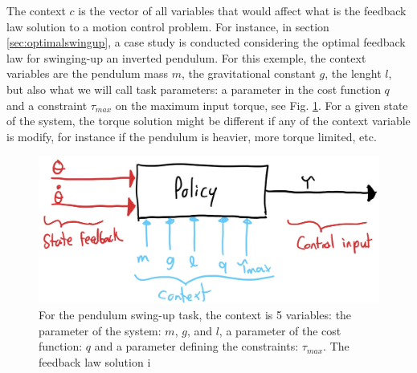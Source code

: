 The context $c$ is the vector of all variables that would affect what is the feedback law solution to a motion control problem. For instance, in section \ref{sec:optimalswingup}, a case study is conducted considering the optimal feedback law for swinging-up an inverted pendulum. For this exemple, the context variables are the pendulum mass $m$, the gravitational constant $g$, the lenght $l$, but also what we will call task parameters: a parameter in the cost function $q$ and a constraint $\tau_{max}$ on the maximum input torque, see Fig. \ref{fig:policy_context}. For a given state of the system, the torque solution might be different if any of the context variable is modify, for instance if the pendulum is heavier, more torque limited, etc.
\begin{figure}[h]
\vspace{-5pt}
\begin{center}
\includegraphics[width=0.95\linewidth]{fig/policy_context.jpg}
\caption{For the pendulum swing-up task, the context is 5 variables: the parameter of the system: $m$, $g$, and $l$, a parameter of the cost function: $q$ and a parameter defining the constraints: $\tau_{max}$. The feedback law solution i
}\label{fig:policy_context}
\end{center}
\vspace{-5pt}
\end{figure}

